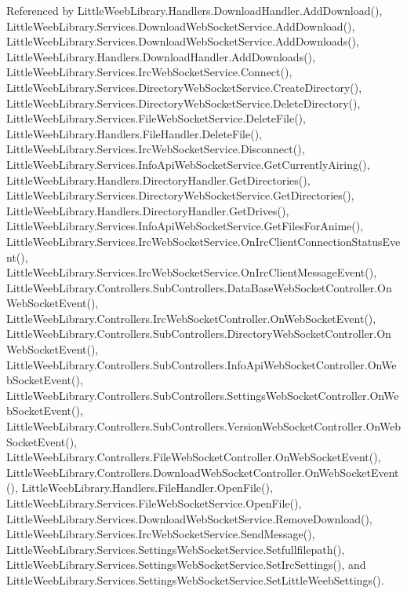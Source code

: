 Referenced by Little\+Weeb\+Library.\+Handlers.\+Download\+Handler.\+Add\+Download(), Little\+Weeb\+Library.\+Services.\+Download\+Web\+Socket\+Service.\+Add\+Download(), Little\+Weeb\+Library.\+Services.\+Download\+Web\+Socket\+Service.\+Add\+Downloads(), Little\+Weeb\+Library.\+Handlers.\+Download\+Handler.\+Add\+Downloads(), Little\+Weeb\+Library.\+Services.\+Irc\+Web\+Socket\+Service.\+Connect(), Little\+Weeb\+Library.\+Services.\+Directory\+Web\+Socket\+Service.\+Create\+Directory(), Little\+Weeb\+Library.\+Services.\+Directory\+Web\+Socket\+Service.\+Delete\+Directory(), Little\+Weeb\+Library.\+Services.\+File\+Web\+Socket\+Service.\+Delete\+File(), Little\+Weeb\+Library.\+Handlers.\+File\+Handler.\+Delete\+File(), Little\+Weeb\+Library.\+Services.\+Irc\+Web\+Socket\+Service.\+Disconnect(), Little\+Weeb\+Library.\+Services.\+Info\+Api\+Web\+Socket\+Service.\+Get\+Currently\+Airing(), Little\+Weeb\+Library.\+Handlers.\+Directory\+Handler.\+Get\+Directories(), Little\+Weeb\+Library.\+Services.\+Directory\+Web\+Socket\+Service.\+Get\+Directories(), Little\+Weeb\+Library.\+Handlers.\+Directory\+Handler.\+Get\+Drives(), Little\+Weeb\+Library.\+Services.\+Info\+Api\+Web\+Socket\+Service.\+Get\+Files\+For\+Anime(), Little\+Weeb\+Library.\+Services.\+Irc\+Web\+Socket\+Service.\+On\+Irc\+Client\+Connection\+Status\+Event(), Little\+Weeb\+Library.\+Services.\+Irc\+Web\+Socket\+Service.\+On\+Irc\+Client\+Message\+Event(), Little\+Weeb\+Library.\+Controllers.\+Sub\+Controllers.\+Data\+Base\+Web\+Socket\+Controller.\+On\+Web\+Socket\+Event(), Little\+Weeb\+Library.\+Controllers.\+Irc\+Web\+Socket\+Controller.\+On\+Web\+Socket\+Event(), Little\+Weeb\+Library.\+Controllers.\+Sub\+Controllers.\+Directory\+Web\+Socket\+Controller.\+On\+Web\+Socket\+Event(), Little\+Weeb\+Library.\+Controllers.\+Sub\+Controllers.\+Info\+Api\+Web\+Socket\+Controller.\+On\+Web\+Socket\+Event(), Little\+Weeb\+Library.\+Controllers.\+Sub\+Controllers.\+Settings\+Web\+Socket\+Controller.\+On\+Web\+Socket\+Event(), Little\+Weeb\+Library.\+Controllers.\+Sub\+Controllers.\+Version\+Web\+Socket\+Controller.\+On\+Web\+Socket\+Event(), Little\+Weeb\+Library.\+Controllers.\+File\+Web\+Socket\+Controller.\+On\+Web\+Socket\+Event(), Little\+Weeb\+Library.\+Controllers.\+Download\+Web\+Socket\+Controller.\+On\+Web\+Socket\+Event(), Little\+Weeb\+Library.\+Handlers.\+File\+Handler.\+Open\+File(), Little\+Weeb\+Library.\+Services.\+File\+Web\+Socket\+Service.\+Open\+File(), Little\+Weeb\+Library.\+Services.\+Download\+Web\+Socket\+Service.\+Remove\+Download(), Little\+Weeb\+Library.\+Services.\+Irc\+Web\+Socket\+Service.\+Send\+Message(), Little\+Weeb\+Library.\+Services.\+Settings\+Web\+Socket\+Service.\+Setfullfilepath(), Little\+Weeb\+Library.\+Services.\+Settings\+Web\+Socket\+Service.\+Set\+Irc\+Settings(), and Little\+Weeb\+Library.\+Services.\+Settings\+Web\+Socket\+Service.\+Set\+Little\+Weeb\+Settings().


